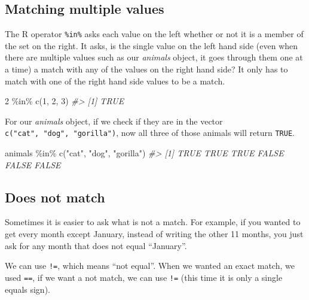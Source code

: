 \documentclass[
]{krantz}
\makeatletter
\newenvironment{Shaded}{\begin{snugshade}}{\end{snugshade}}
\newcommand{\CommentTok}[1]{\textcolor[rgb]{0.37,0.37,0.37}{\textit{#1}}}
\newcommand{\DecValTok}[1]{\textcolor[rgb]{0.06,0.06,0.06}{#1}}
\newcommand{\FunctionTok}[1]{\textcolor[rgb]{0,0,0}{#1}}
\newcommand{\NormalTok}[1]{#1}
\newcommand{\SpecialCharTok}[1]{\textcolor[rgb]{0,0,0}{#1}}
\newcommand{\StringTok}[1]{\textcolor[rgb]{0.5,0.5,0.5}{#1}}
\newenvironment{kframe}{%
\medskip{}
\setlength{\fboxsep}{.8em}
 \def\at@end@of@kframe{}%
 \ifinner\ifhmode%
  \def\at@end@of@kframe{\end{minipage}}%
  \begin{minipage}{\columnwidth}%
 \fi\fi%
 \def\FrameCommand##1{\hskip\@totalleftmargin \hskip-\fboxsep
 \colorbox{shadecolor}{##1}\hskip-\fboxsep
     \hskip-\linewidth \hskip-\@totalleftmargin \hskip\columnwidth}%
 \MakeFramed {\advance\hsize-\width
   \@totalleftmargin\z@ \linewidth\hsize
   \@setminipage}}%
 {\par\unskip\endMakeFramed%
 \at@end@of@kframe}
\renewenvironment{Shaded}{\begin{kframe}}{\end{kframe}}
\makeatother
\begin{document}
\hypertarget{matching-multiple-values}{%
\subsection{Matching multiple values}\label{matching-multiple-values}}

The R operator \texttt{\%in\%} asks each value on the left whether or not it is a member of the set on the right. It asks, is the single value on the left hand side (even when there are multiple values such as our \emph{animals} object, it goes through them one at a time) a match with any of the values on the right hand side? It only has to match with one of the right hand side values to be a match.

\begin{Shaded}
\begin{Highlighting}[]
\DecValTok{2} \SpecialCharTok{\%in\%} \FunctionTok{c}\NormalTok{(}\DecValTok{1}\NormalTok{, }\DecValTok{2}\NormalTok{, }\DecValTok{3}\NormalTok{) }
\CommentTok{\#\textgreater{} [1] TRUE}
\end{Highlighting}
\end{Shaded}

For our \emph{animals} object, if we check if they are in the vector \texttt{c("cat",\ "dog",\ "gorilla")}, now all three of those animals will return \texttt{TRUE}.

\begin{Shaded}
\begin{Highlighting}[]
\NormalTok{animals }\SpecialCharTok{\%in\%} \FunctionTok{c}\NormalTok{(}\StringTok{"cat"}\NormalTok{, }\StringTok{"dog"}\NormalTok{, }\StringTok{"gorilla"}\NormalTok{)}
\CommentTok{\#\textgreater{} [1]  TRUE  TRUE  TRUE FALSE FALSE FALSE}
\end{Highlighting}
\end{Shaded}

\hypertarget{does-not-match}{%
\subsection{Does not match}\label{does-not-match}}

Sometimes it is easier to ask what is not a match. For example, if you wanted to get every month except January, instead of writing the other 11 months, you just ask for any month that does not equal ``January''.

We can use \texttt{!=}, which means ``not equal''. When we wanted an exact match, we used \texttt{==}, if we want a not match, we can use \texttt{!=} (this time it is only a single equals sign).
\end{document}

